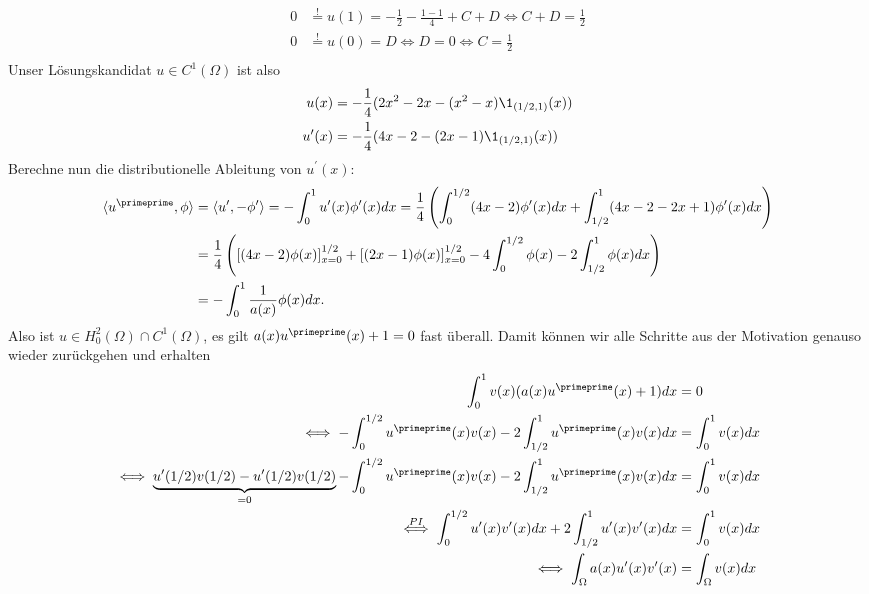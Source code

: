 \begin{solution}
\begin{align*}
  0 &\stackrel{!}{=} u(1) = -\frac{1}{2} - \frac{1-1}{4} + C + D \iff C + D = \frac{1}{2} \\
  0 &\stackrel{!}{=} u(0) = D \iff D = 0 \iff C = \frac{1}{2} \\
\end{align*}
Unser Lösungskandidat $u \in C^1(\Omega)$ ist also
\begin{align*}
  u(x) &= -\frac{1}{4}(2x^2-2x- (x^2-x)\1_{(1/2,1)}(x)) \\
  u^{\prime}(x) &= -\frac{1}{4}(4x -2 - (2x-1)\1_{(1/2,1)}(x))
\end{align*}
Berechne nun die distributionelle Ableitung von $u^{\prime}(x)$:
\begin{align*}
  \langle u^{\primeprime}, \phi \rangle &= \langle u^{\prime}, -\phi^{\prime}\rangle
  = -\int_0^1 u^{\prime}(x)\phi^{\prime}(x) dx = \frac{1}{4}\left(\int_0^{1/2}(4x-2)\phi^{\prime}(x) dx +
  \int_{1/2}^1(4x-2-2x+1)\phi^{\prime}(x) dx\right) \\
  &= \frac{1}{4}\left([(4x-2)\phi(x)]_{x=0}^{1/2} + [(2x-1)\phi(x)]_{x=0}^{1/2} -
  4\int_0^{1/2}\phi(x) - 2\int_{1/2}^1\phi(x)dx\right) \\
  &= -\int_0^1 \frac{1}{a(x)}\phi(x) dx.
\end{align*}
Also ist $u \in H_0^2(\Omega) \cap C^1(\Omega)$, es gilt $a(x)u^{\primeprime}(x) + 1 = 0$
fast überall. Damit können wir alle Schritte aus der Motivation genauso wieder
zurückgehen und erhalten
\begin{align*}
  \int_0^1 v(x)(a(x)u^{\primeprime}(x) + 1) dx &= 0 \\
  \iff - \int_0^{1/2}u^{\primeprime}(x)v(x) -2\int_{1/2}^1 u^{\primeprime}(x)v(x) dx
  &= \int_0^1 v(x) dx \\
   \iff \underbrace{u^{\prime}(1/2)v(1/2) - u^{\prime}(1/2)v(1/2)}_{=0} - \int_0^{1/2}u^{\primeprime}(x)v(x)
  -2 \int_{1/2}^1 u^{\primeprime}(x)v(x) dx  &=
  \int_0^1 v(x) dx \\
  \stackrel{PI}{\iff} \int_0^{1/2} u^{\prime}(x)v^{\prime}(x)dx +
  2\int_{1/2}^1 u^{\prime}(x)v^{\prime}(x) dx &= \int_0^1 v(x) dx \\
  \iff \int_\Omega a(x)u^{\prime}(x)v^{\prime}(x) &= \int_\Omega v(x) dx
\end{align*}
\end{solution}

